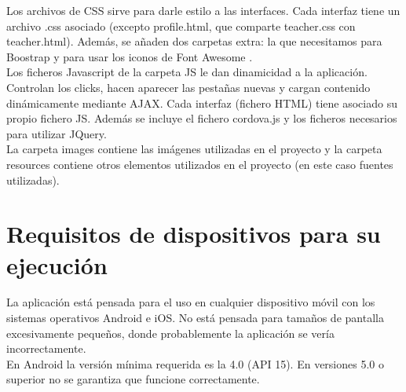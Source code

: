 Los archivos de CSS sirve para darle estilo a las interfaces. Cada interfaz tiene un archivo .css asociado (excepto profile.html, que comparte teacher.css con teacher.html). Además, se añaden dos carpetas extra: la que necesitamos para Boostrap \hyperref[boostrap]{\cite{boostrap}} y para usar los iconos de Font Awesome \hyperref[fontawesome]{\cite{fontawesome}}.\\

Los ficheros Javascript de la carpeta JS le dan dinamicidad a la aplicación. Controlan los clicks, hacen aparecer las pestañas nuevas y cargan contenido dinámicamente mediante AJAX. Cada interfaz (fichero HTML) tiene asociado su propio fichero JS. Además se incluye el fichero cordova.js y los ficheros necesarios para utilizar JQuery.\\

La carpeta images contiene las imágenes utilizadas en el proyecto y la carpeta resources contiene otros elementos utilizados en el proyecto (en este caso fuentes utilizadas).\\

\section{Requisitos de dispositivos para su ejecución}
\label{diseno-e-implementacion:dispositivos}

La aplicación está pensada para el uso en cualquier dispositivo móvil con los sistemas operativos Android e iOS. No está pensada para tamaños de pantalla excesivamente pequeños, donde probablemente la aplicación se vería incorrectamente.\\

En Android la versión mínima requerida es la 4.0 (API 15). En versiones 5.0 o superior no se garantiza que funcione correctamente.\\